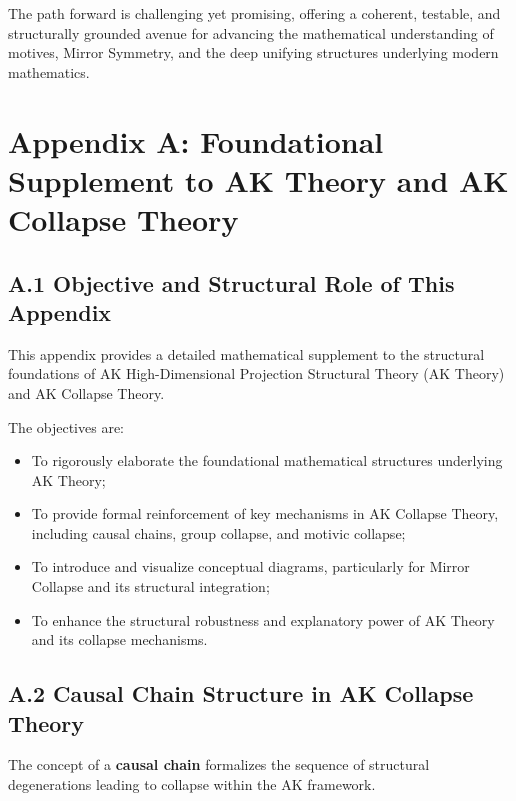 \documentclass[11pt]{article}
\begin{document}
The path forward is challenging yet promising, offering a coherent, testable, and structurally grounded avenue for advancing the mathematical understanding of motives, Mirror Symmetry, and the deep unifying structures underlying modern mathematics.

\FloatBarrier




\appendix
\section*{Appendix A: Foundational Supplement to AK Theory and AK Collapse Theory}

\subsection*{A.1 Objective and Structural Role of This Appendix}

This appendix provides a detailed mathematical supplement to the structural foundations of AK High-Dimensional Projection Structural Theory (AK Theory) and AK Collapse Theory.

The objectives are:

\begin{itemize}
    \item To rigorously elaborate the foundational mathematical structures underlying AK Theory;
    \item To provide formal reinforcement of key mechanisms in AK Collapse Theory, including causal chains, group collapse, and motivic collapse;
    \item To introduce and visualize conceptual diagrams, particularly for Mirror Collapse and its structural integration;
    \item To enhance the structural robustness and explanatory power of AK Theory and its collapse mechanisms.
\end{itemize}

\subsection*{A.2 Causal Chain Structure in AK Collapse Theory}

The concept of a \textbf{causal chain} formalizes the sequence of structural degenerations leading to collapse within the AK framework.
\end{document}
